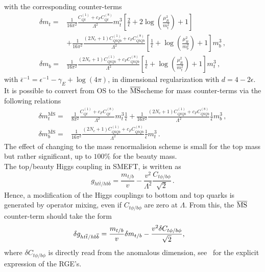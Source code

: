 with the corresponding counter-terms
\begin{align}
	\delta m_t =&\frac{1}{16 \pi^2} \frac{C_{Qt}^{(1)}+c_F C_{Qt}^{(8)}}{\Lambda^2}m_t^3\left[ \frac{2}{\bar{\epsilon}} +2 \log\left(\frac{\mu_R^2}{m_t^2}\right)+1\right] \\ &+ \frac{1}{16 \pi^2}  \frac{(2 N_c+1) C_{QtQb}^{(1)}+c_F C_{QtQb}^{(8)}}{\Lambda^2}  \left[ \frac{1}{\bar{\epsilon}} +  \log\left(\frac{\mu_R^2}{m_b^2}\right)+1 \right]  m_b^3\,, \nonumber \\
	\delta m_b=&\frac{1}{16 \pi^2} \frac{(2 N_c+1)C_{QtQb}^{(1)}+c_F C_{QtQb}^{(8)}}{\Lambda^2}\left[ \frac{1}{\bar{\epsilon}} +\log\left( \frac{\mu_R^2}{m_t^2}\right)+1\right] m_t^3\,,
\end{align}
with $\bar{\epsilon}^{-1} = \epsilon^{-1}- \gamma_E +\log(4 \pi)$, in dimensional regularization with $d=4-2\epsilon$. 
It is possible to convert from OS to the $\MSbar$\;scheme for mass counter-terms via the following relations
\begin{align}
	\delta m_t^{\bar{\text{MS}}} =&\frac{1}{8 \pi^2} \frac{C_{Qt}^{(1)}+c_F C_{Qt}^{(8)}}{\Lambda^2}m_t^3\frac{1}{\bar{\epsilon}}+ \frac{1}{16 \pi^2}  \frac{(2 N_c+1) C_{QtQb}^{(1)}+c_F C_{QtQb}^{(8)}}{\Lambda^2}   \frac{1}{\bar{\epsilon}}  m_b^3\,,  \\
	\delta m_b^{\bar{\text{MS}}}=&\frac{1}{16 \pi^2} \frac{(2 N_c+1)C_{QtQb}^{(1)}+c_F C_{QtQb}^{(8)}}{\Lambda^2}\frac{1}{\bar{\epsilon}} m_t^3\,.
\end{align} 
The effect of changing to the mass renormalision  scheme is small for the top mass but rather significant, up to $100\%$ for the beauty mass. \\
 The top/beauty Higgs coupling in SMEFT, is written as
\begin{equation}
	g_{ht\bar{t}/hb\bar{b}}=\frac{m_{t/b}}{v}-\frac{v^2}{\Lambda^2}\frac{C_{t\phi/b\phi}}{\sqrt{2}}\,.
\end{equation}
Hence, a modification of the Higgs couplings to bottom and top quarks is generated by operator mixing, even if $C_{t\phi/b\phi}$ are zero at $\Lambda$. From this, the $\MSbar$ counter-term should take the form 
\begin{align}
	\delta	g_{ht\bar{t}/hb\bar{b}} &=  {m_{t/b}\over v} \delta{m_{t/b}} -{v^2 \delta{C_{t\phi/b\phi}}\over \sqrt{2} },
\end{align}
where $\delta{C_{t\phi/b\phi}}$ is directly read from the anomalous dimension, see~ for the explicit expression of the RGE's. 
